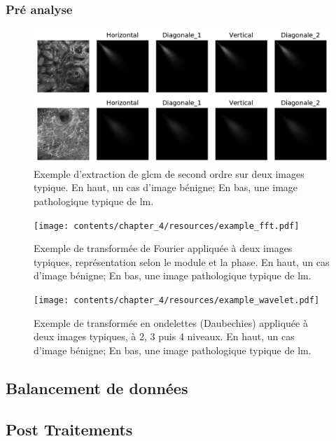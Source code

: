 \subsubsection{Pré analyse}
\begin{figure}[H]
    \centering
    \includegraphics[width=\linewidth]{contents/chapter_4/resources/example_glcm.pdf}
    \caption{Exemple d'extraction de \gls{glcm} de second ordre sur deux images typique. En haut, un cas d'image bénigne; En bas, une image pathologique typique de \gls{lm}.}
    \label{fig:example_glcm}
\end{figure}\par

\begin{figure}[H]
    \centering
    \texttt{[image: contents/chapter\_4/resources/example\_fft.pdf]}
    \caption{Exemple de transformée de Fourier appliquée à deux images typiques, représentation selon le module et la phase. En haut, un cas d'image bénigne; En bas, une image pathologique typique de \gls{lm}.}
    \label{fig:example_fft}
\end{figure}\par

\begin{figure}[H]
    \centering
    \texttt{[image: contents/chapter\_4/resources/example\_wavelet.pdf]}
    \caption{Exemple de transformée en ondelettes (Daubechies) appliquée à deux images typiques, à 2, 3 puis 4 niveaux. En haut, un cas d'image bénigne; En bas, une image pathologique typique de \gls{lm}.}
    \label{fig:example_wavelet}
\end{figure}\par

\subsection{Balancement de données}
\subsection{Post Traitements}
